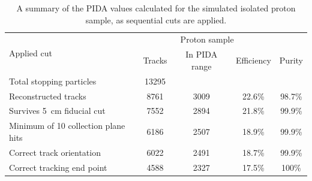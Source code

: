 \begin{table}
  \caption[A summary of the PIDA values calculated for the simulated isolated proton sample, as sequential cuts are applied]
          {A summary of the PIDA values calculated for the simulated isolated proton sample, as sequential cuts are applied.}
  \centering
  \label{tab:Isol_PIDA_Proton}
  \begin{tabular}{l c c c c}
    \toprule
    \multirow{2}{*}{Applied cut} & \multicolumn{3}{c}{Proton sample} \\ 
    \cmidrule{2-5}
      & Tracks & In PIDA range & Efficiency & Purity \\ 
    \midrule
      Total stopping particles            & 13295 &     &        & \\

      Reconstructed tracks                & 8761 & 3009 & 22.6\% & 98.7\% \\

      Survives 5~cm fiducial cut          & 7552 & 2894 & 21.8\% & 99.9\% \\

      Minimum of 10 collection plane hits & 6186 & 2507 & 18.9\% & 99.9\% \\

      Correct track orientation           & 6022 & 2491 & 18.7\% & 99.9\% \\

      Correct tracking end point          & 4588 & 2327 & 17.5\% & 100\% \\
    \bottomrule
  \end{tabular}
\end{table}

